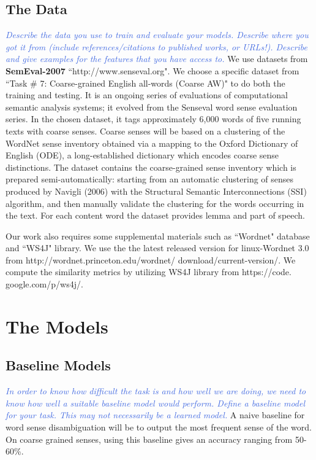 \documentclass[11pt,letterpaper]{article}
\newcommand{\blue}[1]{\textcolor{RoyalBlue}{#1}}
\newcommand{\instructions}[1]{\blue{\textit{#1}}}
\begin{document}
\subsection{The Data}
\label{sec:data}
\instructions{Describe the data you use to train and evaluate your models. Describe where you got it from (include references/citations to published works, or URLs!). Describe and give examples for the features that you have access to.} 
We use datasets from \textbf{SemEval-2007} ``http://www.senseval.org". We choose a specific dataset from ``Task \# 7: Coarse-grained English all-words (Coarse AW)" to do both the training and testing. It is an ongoing series of evaluations of computational semantic analysis systems; it evolved from the Senseval word sense evaluation series. In the chosen dataset, it tags approximately 6,000 words of five running texts with coarse senses. Coarse senses will be based on a clustering of the WordNet sense inventory obtained via a mapping to the Oxford Dictionary of English (ODE), a long-established dictionary which encodes coarse sense distinctions. The dataset contains the coarse-grained sense inventory which is prepared semi-automatically: starting from an automatic clustering of senses produced by Navigli (2006) with the Structural Semantic Interconnections (SSI) algorithm, and then manually validate the clustering for the words occurring in the text. For each content word the dataset provides lemma and part of speech.

Our work also requires some supplemental materials such as ``Wordnet" database and ``WS4J" library. We use the the latest released version for linux-Wordnet 3.0 from http://wordnet.princeton.edu/wordnet/ download/current-version/. We compute the similarity metrics by utilizing WS4J library from https://code. google.com/p/ws4j/.

\section{The Models}
\label{sec:models}

\subsection{Baseline Models}
\label{sec:baseline-models}
\instructions{In order to know how difficult the task is and how well we are doing, we need to know how well a suitable baseline model would perform. Define a baseline model for your task. This may not necessarily be a learned model.}
A naive baseline for word sense disambiguation will be to output the most frequent sense of the word. On coarse grained senses, using this baseline gives an accuracy ranging from 50-60\%.
\end{document}

